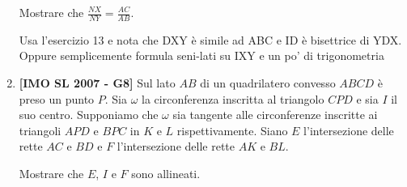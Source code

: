 \begin{enumerate}
	Mostrare che $\displaystyle\frac{NX}{NY}=\displaystyle\frac{AC}{AB}$.
	
	\begin{sol}Usa l'esercizio 13 e nota che DXY è simile ad ABC e ID è bisettrice di YDX. Oppure semplicemente formula seni-lati su IXY e un po' di trigonometria
	\end{sol}
	
	\item \textbf{[IMO SL 2007 - G8]}
	Sul lato $AB$ di un quadrilatero convesso $ABCD$ è preso un punto $P$. Sia $\omega$ la circonferenza inscritta al triangolo $CPD$ e sia $I$ il suo centro. Supponiamo che $\omega$ sia tangente alle circonferenze inscritte ai triangoli $APD$ e $BPC$ in $K$ e $L$ rispettivamente. Siano $E$ l'intersezione delle rette $AC$ e $BD$ e $F$ l'intersezione delle rette $AK$ e $BL$.
	
	Mostrare che $E$, $I$ e $F$ sono allineati.
	

\end{enumerate}
\clearpage
